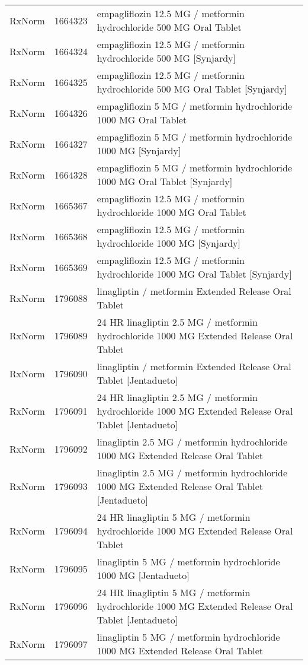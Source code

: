 \begin{longtable}{p{}p{}p{}}
  RxNorm & 1664323 & empagliflozin 12.5 MG / metformin hydrochloride 500 MG Oral Tablet \\ 
  RxNorm & 1664324 & empagliflozin 12.5 MG / metformin hydrochloride 500 MG [Synjardy] \\ 
  RxNorm & 1664325 & empagliflozin 12.5 MG / metformin hydrochloride 500 MG Oral Tablet [Synjardy] \\ 
  RxNorm & 1664326 & empagliflozin 5 MG / metformin hydrochloride 1000 MG Oral Tablet \\ 
  RxNorm & 1664327 & empagliflozin 5 MG / metformin hydrochloride 1000 MG [Synjardy] \\ 
  RxNorm & 1664328 & empagliflozin 5 MG / metformin hydrochloride 1000 MG Oral Tablet [Synjardy] \\ 
  RxNorm & 1665367 & empagliflozin 12.5 MG / metformin hydrochloride 1000 MG Oral Tablet \\ 
  RxNorm & 1665368 & empagliflozin 12.5 MG / metformin hydrochloride 1000 MG [Synjardy] \\ 
  RxNorm & 1665369 & empagliflozin 12.5 MG / metformin hydrochloride 1000 MG Oral Tablet [Synjardy] \\ 
  RxNorm & 1796088 & linagliptin / metformin Extended Release Oral Tablet \\ 
  RxNorm & 1796089 & 24 HR linagliptin 2.5 MG / metformin hydrochloride 1000 MG Extended Release Oral Tablet \\ 
  RxNorm & 1796090 & linagliptin / metformin Extended Release Oral Tablet [Jentadueto] \\ 
  RxNorm & 1796091 & 24 HR linagliptin 2.5 MG / metformin hydrochloride 1000 MG Extended Release Oral Tablet [Jentadueto] \\ 
  RxNorm & 1796092 & linagliptin 2.5 MG / metformin hydrochloride 1000 MG Extended Release Oral Tablet \\ 
  RxNorm & 1796093 & linagliptin 2.5 MG / metformin hydrochloride 1000 MG Extended Release Oral Tablet [Jentadueto] \\ 
  RxNorm & 1796094 & 24 HR linagliptin 5 MG / metformin hydrochloride 1000 MG Extended Release Oral Tablet \\ 
  RxNorm & 1796095 & linagliptin 5 MG / metformin hydrochloride 1000 MG [Jentadueto] \\ 
  RxNorm & 1796096 & 24 HR linagliptin 5 MG / metformin hydrochloride 1000 MG Extended Release Oral Tablet [Jentadueto] \\ 
  RxNorm & 1796097 & linagliptin 5 MG / metformin hydrochloride 1000 MG Extended Release Oral Tablet \\ 

\end{longtable}

